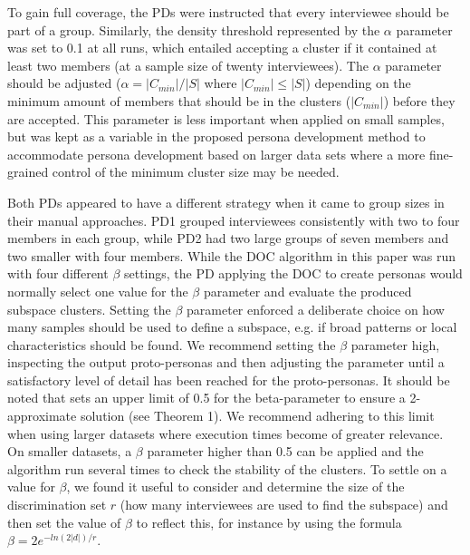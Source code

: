 To gain full coverage, the PDs were instructed that every interviewee should be part of a group. Similarly, the density threshold represented by the $\alpha$ parameter was set to 0.1 at all runs, which entailed accepting a cluster if it contained at least two members (at a sample size of twenty interviewees). The $\alpha$ parameter should be adjusted ($\alpha = |C_{min}|/|S|$ where $|C_{min}| \leq |S|$) depending on the minimum amount of members that should be in the clusters ($|C_{min}|$) before they are accepted. This parameter is less important when applied on small samples, but was kept as a variable in the proposed persona development method to accommodate persona development based on larger data sets where a more fine-grained control of the minimum cluster size may be needed.

Both PDs appeared to have a different strategy when it came to group sizes in their manual approaches. PD1 grouped interviewees consistently with two to four members in each group, while PD2 had two large groups of seven members and two smaller with four members. While the DOC algorithm in this paper was run with four different $\beta$ settings, the PD applying the DOC to create personas would normally select one value for the $\beta$ parameter and evaluate the produced subspace clusters. Setting the $\beta$ parameter enforced a deliberate choice on how many samples should be used to define a subspace, e.g. if broad patterns or local characteristics should be found. We recommend setting the $\beta$ parameter high, inspecting the output proto-personas and then adjusting the parameter until a satisfactory level of detail has been reached for the proto-personas. It should be noted that \cite{Procopiuc2002} sets an upper limit of 0.5 for the beta-parameter to ensure a 2-approximate solution (see Theorem 1). We recommend adhering to this limit when using larger datasets where execution times become of greater relevance. On smaller datasets, a $\beta$ parameter higher than 0.5 can be applied and the algorithm run several times to check the stability of the clusters. To settle on a value for $\beta$, we found it useful to consider and determine the size of the discrimination set $r$ (how many interviewees are used to find the subspace) and then set the value of $\beta$ to reflect this, for instance by using the formula $ \beta = 2e^{-ln(2|d|)/r} $.


